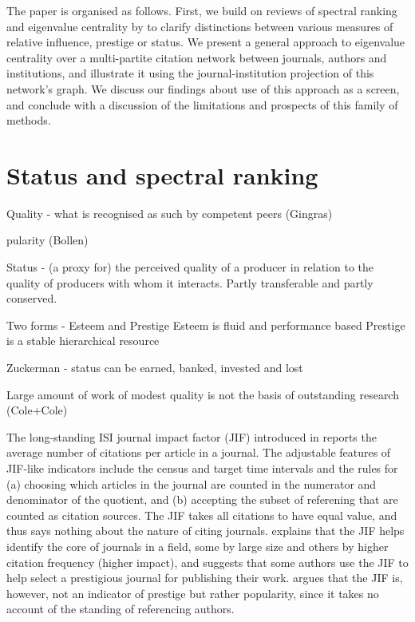 \documentclass[10pt]{article}
\begin{document}
The paper is organised as follows. First, we build on reviews of spectral ranking and eigenvalue centrality by \cite{franceschetPageRankStandingShoulders2011, vignaSpectralRanking2016} to clarify distinctions between various measures of relative influence, prestige or status. We present a general approach to eigenvalue centrality over a multi-partite citation network between journals, authors and institutions, and illustrate it using the journal-institution projection of this network's graph. We discuss our findings about use of this approach as a screen, and conclude with a discussion of the limitations and prospects of this family of methods. 

\section{Status and spectral ranking}

Quality - what is recognised as such by competent peers (Gingras)

pularity (Bollen)

Status - (a proxy for) the perceived quality of a producer in relation to the quality of producers with whom it interacts. Partly transferable and partly conserved.

Two forms - Esteem and Prestige
Esteem is fluid and performance based
Prestige is a stable hierarchical resource

Zuckerman - status can be earned, banked, invested and lost

Large amount of work of modest quality is not the basis of outstanding research (Cole+Cole)









The long-standing ISI journal impact factor (JIF) introduced in \cite{garfield1955, garfieldHistoryMeaningJournal2006} reports the average number of citations per article in a journal. The adjustable features of JIF-like indicators include the census and target time intervals and the rules for (a) choosing which articles in the journal are counted in the numerator and denominator of the quotient, and (b) accepting the subset of referening that are counted as citation sources. The JIF takes all citations to have equal value, and thus says nothing about the nature of citing journals. \cite{garfieldHistoryMeaningJournal2006} explains that the JIF helps identify the core of journals in a field, some by large size and others by higher citation frequency (higher impact), and suggests that some authors use the JIF to help select a prestigious journal for publishing their work. \cite{bollenJournalStatus2006a} argues that the JIF is, however, not an indicator of prestige but rather popularity, since it takes no account of the standing of referencing authors. 
 
\end{document}
